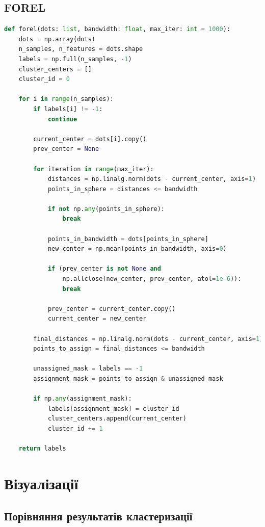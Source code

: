 \documentclass[12pt,a4paper]{article}
\begin{document}
\subsection{FOREL}
\begin{lstlisting}[language=Python, caption=Реалізація FOREL]
def forel(dots: list, bandwidth: float, max_iter: int = 1000):
    dots = np.array(dots)
    n_samples, n_features = dots.shape
    labels = np.full(n_samples, -1)
    cluster_centers = []
    cluster_id = 0

    for i in range(n_samples):
        if labels[i] != -1:
            continue
        
        current_center = dots[i].copy()
        prev_center = None
        
        for iteration in range(max_iter):
            distances = np.linalg.norm(dots - current_center, axis=1)
            points_in_sphere = distances <= bandwidth
            
            if not np.any(points_in_sphere):
                break
            
            points_in_bandwidth = dots[points_in_sphere]
            new_center = np.mean(points_in_bandwidth, axis=0)
            
            if (prev_center is not None and 
                np.allclose(new_center, prev_center, atol=1e-6)):
                break
            
            prev_center = current_center.copy()
            current_center = new_center
        
        final_distances = np.linalg.norm(dots - current_center, axis=1)
        points_to_assign = final_distances <= bandwidth
        
        unassigned_mask = labels == -1
        assignment_mask = points_to_assign & unassigned_mask
        
        if np.any(assignment_mask):
            labels[assignment_mask] = cluster_id
            cluster_centers.append(current_center)
            cluster_id += 1

    return labels
\end{lstlisting}

\section{Візуалізації}
\subsection{Порівняння результатів кластеризації}
\end{document}
